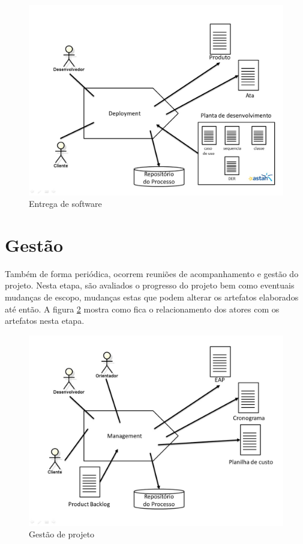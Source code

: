 \begin{figure}[H]
\caption{\label{entrega} Entrega de software}
\includegraphics[scale=0.33]{img/entrega-software.jpg}
\end{figure}

\section{Gestão}
Também de forma periódica, ocorrem reuniões de acompanhamento e gestão do projeto. Nesta etapa, são avaliados o progresso do projeto bem como eventuais mudanças de escopo, mudanças estas que podem alterar os artefatos elaborados até então. A figura \ref{gestao} mostra como fica o relacionamento dos atores com os artefatos nesta etapa.

\begin{figure}[H]
\caption{\label{gestao} Gestão de projeto}
\includegraphics[scale=0.33]{img/gestao.jpg}
\end{figure}

